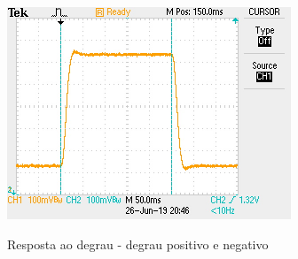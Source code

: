 \documentclass[
	12pt,				%
	article,			%
	openright,			%
	oneside,
	a4paper,			%
	chapter=TITLE,		%
	section=TITLE,		%
	english,			%
	french,				%
	spanish,			%
	brazil,				%
]{abntex2}
\begin{document}
\begin{apendicesenv}
        	\begin{figure}[htbp]
            	\centering
            	\caption{Resposta ao degrau - degrau positivo e negativo}
            	\includegraphics[width=\textwidth,height=240px,keepaspectratio]{imgs/ftmf/step_response_both_steps.JPG}
            	\label{fig-ftmf-step_response_both_steps}
        	\end{figure}
        	
        	\FloatBarrier
        	
        	\clearpage
	
	\end{apendicesenv}
	
	
%		
%		
	
	
	
	\printindex
		
\end{document}
